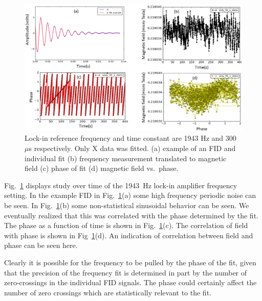 \begin{figure}%
\centering
\includegraphics[width=0.9\linewidth]{figures/freq_1943_single_fit_300microsec.png}
\caption{Lock-in reference frequency and time constant are 1943 Hz and
  300~$\mu$s respectively.  Only X data was fitted.  (a) example of an
  FID and individual fit (b) frequency measurement translated to
  magnetic field (c) phase of fit (d) magnetic field
  vs.~phase.\label{fig:freq_1943_single_fit_300_micros}}
\end{figure}

Fig.~\ref{fig:freq_1943_single_fit_300_micros} displays study over
time of the 1943~Hz lock-in amplifier frequency setting.  In the
example FID in Fig.~\ref{fig:freq_1943_single_fit_300_micros}(a) some
high frequency periodic noise can be seen.  In
Fig.~\ref{fig:freq_1943_single_fit_300_micros}(b) some non-statistical
sinusoidal behavior can be seen.  We eventually realized that this was
correlated with the phase determined by the fit.  The phase as a
function of time is shown in
Fig.~\ref{fig:freq_1943_single_fit_300_micros}(c).  The correlation of
field with phase is shown in
Fig~\ref{fig:freq_1943_single_fit_300_micros}(d).  An indication of
correlation between field and phase can be seen here.

Clearly it is possible for the frequency to be pulled by the phase of
the fit, given that the precision of the frequency fit is determined
in part by the number of zero-crossings in the individual FID signals.
The phase could certainly affect the number of zero crossings which
are statistically relevant to the fit.

